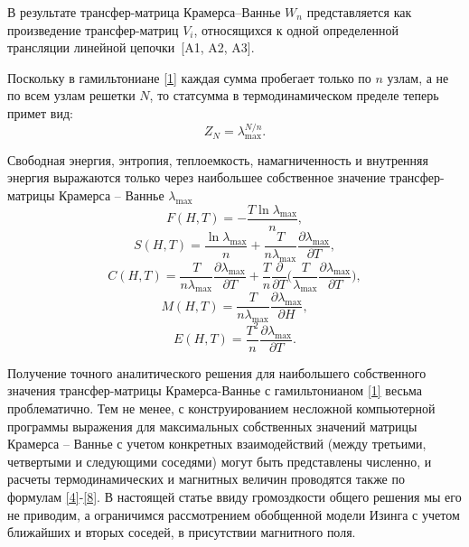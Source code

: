 В результате трансфер-матрица Крамерса--Ваннье $W_n$ представляется как произведение трансфер-матриц $V_i$, относящихся к одной определенной трансляции линейной цепочки~[A1, A2, A3].

Поскольку в гамильтониане \eqref{1} каждая сумма пробегает только по $n$ узлам, а не по всем узлам решетки $N$, то статсумма в термодинамическом пределе теперь примет вид:
\begin{equation}
Z_N=\lambda_{\text{max}}^{N/n}.
\label{3}
\end{equation}

Свободная энергия, энтропия, теплоемкость, намагниченность и внутренняя энергия выражаются только через наибольшее собственное значение трансфер-матрицы Крамерса -- Ваннье $\lambda_{\text{max}}$
\begin{equation}
F(H,T)=-\frac{T \ln \lambda_{\text{max}}}{n},
\label{4}
\end{equation}
\begin{equation}
S(H,T)=\frac{\ln \lambda_{\text{max}}}{n}+\frac{T}{n\lambda_{\text{max}}}\frac{\partial \lambda_{\text{max}}}{\partial T},
\label{5}
\end{equation}
\begin{equation}
C(H,T)=\frac{T}{n\lambda_{\text{max}}}\frac{\partial \lambda_{\text{max}}}{\partial T} + \frac{T}{n}\frac{\partial }{\partial T}\bigg(\frac{T}{\lambda_{\text{max}}}\frac{\partial \lambda_{\text{max}}}{\partial T}\bigg),
\label{6}
\end{equation}
\begin{equation}
M(H,T)=\frac{T}{n\lambda_{\text{max}}}\frac{\partial \lambda_{\text{max}}}{\partial H},
\label{7}
\end{equation}
\begin{equation}
E(H,T)=\frac{T^2}{n}\frac{\partial \lambda_{\text{max}}}{\partial T}.
\label{8}
\end{equation}

Получение точного аналитического решения для наибольшего собственного значения трансфер-матрицы Крамерса-Ваннье с гамильтонианом \eqref{1} весьма проблематично. Тем не менее, с конструированием несложной компьютерной программы выражения для максимальных собственных значений матрицы Крамерса -- Ваннье с учетом конкретных взаимодействий (между третьими, четвертыми и следующими соседями) могут быть представлены численно, и расчеты термодинамических и магнитных величин проводятся также по формулам \eqref{4}-\eqref{8}. В настоящей статье ввиду громоздкости общего решения мы его не приводим, а ограничимся рассмотрением обобщенной модели Изинга с учетом ближайших и вторых соседей, в присутствии магнитного поля.

